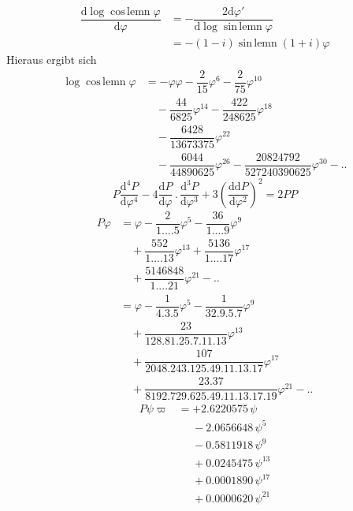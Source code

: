 \[
\begin{aligned}\dfrac{\mathrm d\log\operatorname{cos\,lemn}\varphi}{\mathrm d\varphi}
&=-\dfrac{2\mathrm d\varphi'}{\mathrm d\log\operatorname{sin\,lemn}\varphi}
\\[7pt]&=-(1-i)\operatorname{sin\,lemn}(1+i)\varphi\end{aligned}
\]
Hieraus ergibt sich
\[
\begin{aligned}
\log\operatorname{cos\,lemn}\varphi
&=-\varphi\varphi-\dfrac2{15}\varphi^6-\dfrac2{75}\varphi^{10}
\\[6pt]&\quad{}-\dfrac{44}{6825}\varphi^{14}-\dfrac{422}{248625}\varphi^{18}
\\[6pt]&\quad{}-\dfrac{6428}{13673375}\varphi^{22}\\[6pt]
&\quad-\dfrac{6044}{44890625}\varphi^{26}
-\dfrac{20824792}{527240390625}\varphi^{30}-\mathord{.}\mathord{.}
\end{aligned}
\]
\[
P\dfrac{\mathrm d^4P}{\mathrm d\varphi^4}
-4\dfrac{\mathrm dP}{\mathrm d\varphi}\, .\,\dfrac{\mathrm d^3P}{\mathrm d\varphi^3}
+3\left(\dfrac{\mathrm d\mathrm dP}{\mathrm d\varphi^2}\right)^2=2PP
\]
\[
\begin{aligned}
P\varphi&=\varphi-\dfrac2{1\mathord{.}\mathord{.}\mathord{.}\mathord{.}5}\varphi^5
-\dfrac{36}{1\mathord{.}\mathord{.}\mathord{.}\mathord{.}9}\varphi^9
\\[6pt]&\quad{}+\dfrac{552}{1\mathord{.}\mathord{.}\mathord{.}\mathord{.}13}\varphi^{13}
+\dfrac{5136}{1\mathord{.}\mathord{.}\mathord{.}\mathord{.}17}\varphi^{17}
\\[6pt]&\quad{}+\dfrac{5146848}{1\mathord{.}\mathord{.}\mathord{.}\mathord{.}21}\varphi^{21}-\mathord{.}\mathord{.}\\[6pt]
&=\varphi-\dfrac1{4.3.5}\varphi^5-\dfrac1{32.9.5.7}\varphi^9
\\[6pt]&\quad{}+\dfrac{23}{128.81.25.7.11.13}\varphi^{13}
\\[6pt]&\quad{}+\dfrac{107}{2048.243.125.49.11.13.17}\varphi^{17}\\[6pt]
&\quad+\dfrac{23.37}{8192.729.625.49.11.13.17.19}\varphi^{21}-\mathord{.}\mathord{.}
\end{aligned}
\]
\[
\begin{aligned}
P\psi\varpi&=+2.6220575\,\psi\\
&\phantom{{}={}}-2.0656648\,\psi^5\\
&\phantom{{}={}}-0.5811918\,\psi^9\\
&\phantom{{}={}}+0.0245475\,\psi^{13}\\
&\phantom{{}={}}+0.0001890\,\psi^{17}\\
&\phantom{{}={}}+0.0000620\,\psi^{21}
\end{aligned}
\]
